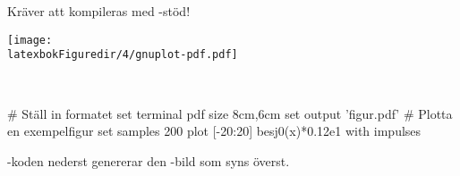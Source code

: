 \documentclass[lang=sv,ptsize=10pt,font=none,nomath,titles=bf,../../a4.tex]{subfiles}
\begin{document}
Kräver att \gnuplot kompileras med \PDF-stöd!

\begin{kod}[tbp]
	\centering
	\begin{minipage}{\textwidth}
		\centering
		\texttt{[image: \\latexbokFiguredir/4/gnuplot-pdf.pdf]}
	\end{minipage}
	\\[2ex]
	\begin{minipage}{\textwidth}
		\begin{matlabcode}
# Ställ in formatet
set terminal pdf size 8cm,6cm
set output 'figur.pdf'
# Plotta en exempelfigur
set samples 200
plot [-20:20] besj0(x)*0.12e1 with impulses
		\end{matlabcode}
	\end{minipage}
	\caption{\gnuplot-koden nederst genererar den \PDF-bild som
	syns överst.}
	\label{ex:gnuplot:pdf}
\end{kod}

\label{sec:4:end}
\end{document}
